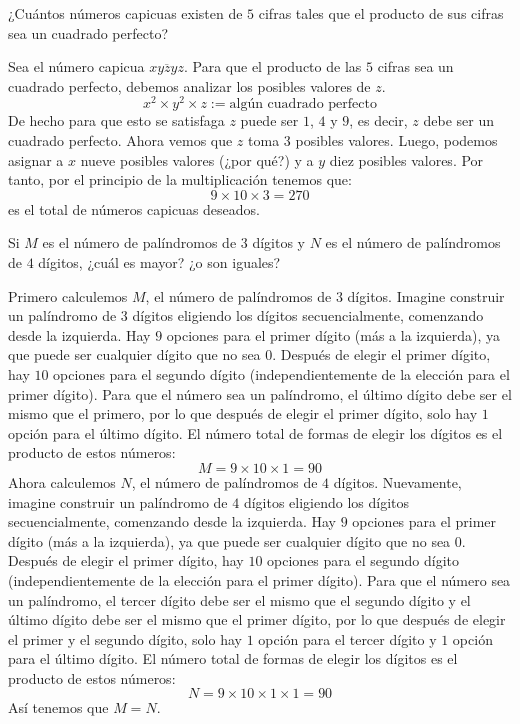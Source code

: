 \documentclass[12pt]{article}
\begin{document}
\begin{ejemplo}
¿Cuántos números capicuas existen de $5$ cifras tales que el producto de sus cifras sea un cuadrado perfecto?
\end{ejemplo}

\begin{solucion}
Sea el número capicua $\displaystyle \overline{xyzyz}$. Para que el producto de las $5$ cifras sea un cuadrado perfecto, debemos analizar los posibles valores de $z$.
\[x^2\times y^2\times z:=\text{algún cuadrado perfecto}\]
De hecho para que esto se satisfaga $z$ puede ser $1$, $4$ y $9$, es decir, $z$ debe ser un cuadrado perfecto. Ahora vemos que $z$ toma $3$ posibles valores. Luego, podemos asignar a $x$ nueve posibles valores (¿por qué?) y a $y$ diez posibles valores. Por tanto, por el principio de la multiplicación tenemos que:
\[9\times 10 \times 3=270\]
es el total de números capicuas deseados.
\end{solucion}

\begin{ejemplo}
    Si $M$ es el número de palíndromos de $3$ dígitos y $N$ es el número de palíndromos de $4$ dígitos, ¿cuál es mayor? ¿o son iguales?
\end{ejemplo}
\begin{solucion}
Primero calculemos $M$, el número de palíndromos de $3$ dígitos. Imagine construir un palíndromo de $3$ dígitos eligiendo los dígitos secuencialmente, comenzando desde la izquierda. Hay $9$ opciones para el primer dígito (más a la izquierda), ya que puede ser cualquier dígito que no sea $0$. Después de elegir el primer dígito, hay $10$ opciones para el segundo dígito (independientemente de la elección para el primer dígito). Para que el número sea un palíndromo, el último dígito debe ser el mismo que el primero, por lo que después de elegir el primer dígito, solo hay $1$ opción para el último dígito. El número total de formas de elegir los dígitos es el producto de estos números:
\[M=9\times 10\times 1=90\]
Ahora calculemos $N$, el número de palíndromos de $4$ dígitos. Nuevamente, imagine construir un palíndromo de $4$ dígitos eligiendo los dígitos secuencialmente, comenzando desde la izquierda. Hay $9$ opciones para el primer dígito (más a la izquierda), ya que puede ser cualquier dígito que no sea $0$. Después de elegir el primer dígito, hay $10$ opciones para el segundo dígito (independientemente de la elección para el primer dígito). Para que el número sea un palíndromo, el tercer dígito debe ser el mismo que el segundo dígito y el último dígito debe ser el mismo que el primer dígito, por lo que después de elegir el primer y el segundo dígito, solo hay $1$ opción para el tercer dígito y $1$ opción para el último dígito. El número total de formas de elegir los dígitos es el producto de estos números:
\[N=9\times 10 \times 1 \times 1=90\]
Así tenemos que $M=N$.
\end{solucion}
\end{document}
